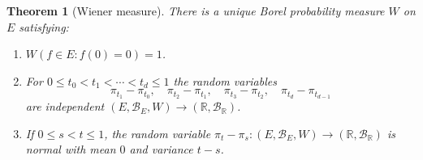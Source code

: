 \documentclass{article}
\newtheorem{theorem}{Theorem}
\theoremstyle{definition}
\begin{document}
\begin{theorem}[Wiener measure]
There is a unique  Borel probability measure $W$ on $E$ satisfying:
\begin{enumerate}
\item $W(f \in E: f(0)=0) = 1$.
\item For $0 \leq t_0 < t_1<\cdots<t_d \leq 1$ the random variables 
\[
\pi_{t_1}-\pi_{t_0}, \quad \pi_{t_2}-\pi_{t_1}, \quad \pi_{t_3}-\pi_{t_2},\quad
\pi_{t_d}-\pi_{t_{d-1}}
\]
are independent $(E,\mathscr{B}_E,W) \to (\mathbb{R},\mathscr{B}_{\mathbb{R}})$.
\item If $0 \leq s < t \leq 1$, the random variable $\pi_t-\pi_s:(E,\mathscr{B}_E,W) \to (\mathbb{R},\mathscr{B}_{\mathbb{R}})$ is normal with mean $0$ and variance $t-s$.
\end{enumerate} 
\end{theorem}
\end{document}
